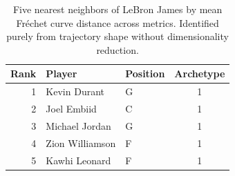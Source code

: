\begin{table}[htbp]
  \centering\small
  \begin{tabular}{rllc}
    \toprule
    Rank & Player & Position & Archetype \\
    \midrule
    1 & Kevin Durant & G & 1 \\
    2 & Joel Embiid & C & 1 \\
    3 & Michael Jordan & G & 1 \\
    4 & Zion Williamson & F & 1 \\
    5 & Kawhi Leonard & F & 1 \\
    \bottomrule
  \end{tabular}
  \caption{Five nearest neighbors of LeBron James by mean Fr\'{e}chet curve distance across metrics. Identified purely from trajectory shape without dimensionality reduction.}
  \label{tab:LeBron_James_frechet_curve_neighbors}
\end{table}

